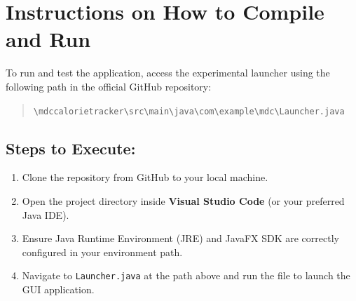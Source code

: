 \documentclass{article}
\begin{document}
\section{Instructions on How to Compile and Run}
To run and test the application, access the experimental launcher using the following path in the official GitHub repository:

\begin{quote}
\verb|\mdccalorietracker\src\main\java\com\example\mdc\Launcher.java|
\end{quote}

\subsection*{Steps to Execute:}
\begin{enumerate}[leftmargin=*]
    \item Clone the repository from GitHub to your local machine.
    \item Open the project directory inside \textbf{Visual Studio Code} (or your preferred Java IDE).
    \item Ensure Java Runtime Environment (JRE) and JavaFX SDK are correctly configured in your environment path.
    \item Navigate to \texttt{Launcher.java} at the path above and run the file to launch the GUI application.
\end{enumerate}
\end{document}
